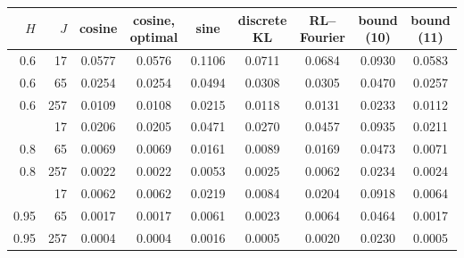 \begin{tabular}{rrccccccc}\toprule
$H$ & $J$ & cosine & cosine, optimal & sine & discrete KL & RL--Fourier & bound (10) & bound (11)\\\midrule
0.6 & 17 & 0.0577 & 0.0576 & 0.1106 & 0.0711 & 0.0684 & 0.0930 & 0.0583 \\
0.6 & 65 & 0.0254 & 0.0254 & 0.0494 & 0.0308 & 0.0305 & 0.0470 & 0.0257 \\
0.6 & 257 & 0.0109 & 0.0108 & 0.0215 & 0.0118 & 0.0131 & 0.0233 & 0.0112 \\
\addlinespace
0.8 & 17 & 0.0206 & 0.0205 & 0.0471 & 0.0270 & 0.0457 & 0.0935 & 0.0211 \\
0.8 & 65 & 0.0069 & 0.0069 & 0.0161 & 0.0089 & 0.0169 & 0.0473 & 0.0071 \\
0.8 & 257 & 0.0022 & 0.0022 & 0.0053 & 0.0025 & 0.0062 & 0.0234 & 0.0024 \\
\addlinespace
0.95 & 17 & 0.0062 & 0.0062 & 0.0219 & 0.0084 & 0.0204 & 0.0918 & 0.0064 \\
0.95 & 65 & 0.0017 & 0.0017 & 0.0061 & 0.0023 & 0.0064 & 0.0464 & 0.0017 \\
0.95 & 257 & 0.0004 & 0.0004 & 0.0016 & 0.0005 & 0.0020 & 0.0230 & 0.0005 \\
\bottomrule\end{tabular}